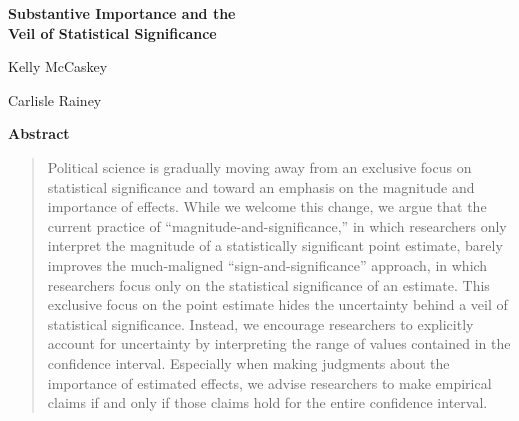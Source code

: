 \documentclass[12pt]{article}
\begin{document}
\begin{center}
{\LARGE \textbf{Substantive Importance and the\\\vspace{2mm}Veil of Statistical Significance}}

\vspace{10mm}

Kelly McCaskey

\vspace{3mm}

Carlisle Rainey
\end{center}

\vspace{10mm}

{\centerline{\textbf{Abstract}}}
\begin{quote}\noindent
Political science is gradually moving away from an exclusive focus on statistical significance and toward an emphasis on the magnitude and importance of effects. While we welcome this change, we argue that the current practice of ``magnitude-and-significance,'' in which researchers only interpret the magnitude of a statistically significant point estimate, barely improves the much-maligned ``sign-and-significance'' approach, in which researchers focus only on the statistical significance of an estimate. This exclusive focus on the point estimate hides the uncertainty behind a veil of statistical significance. Instead, we encourage researchers to explicitly account for uncertainty by interpreting the range of values contained in the confidence interval. Especially when making judgments about the importance of estimated effects, we advise researchers to make empirical claims if and only if those claims hold for the entire confidence interval.
 \end{quote}
\end{document}
